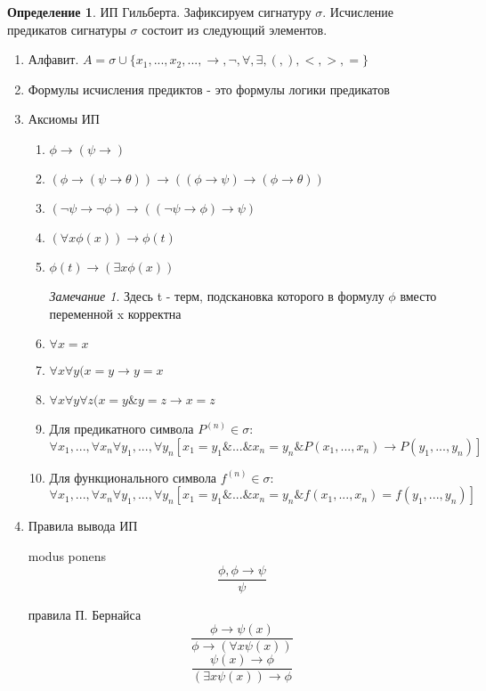 \documentclass[a4paper]{article}
\theoremstyle{definition}
\newtheorem*{definition}{Определение}
\theoremstyle{remark}
\newtheorem*{remark}{Замечание}
\begin{document}
	\begin{definition}
		ИП Гильберта. 
		Зафиксируем сигнатуру $\sigma$. Исчисление предикатов сигнатуры $\sigma$ состоит из следующий элементов.
		\begin{enumerate}
			\item Алфавит. $A = \sigma \cup \{x_1, ..., x_2, ..., \rightarrow, \neg, \forall, \exists, (, ), <,> , =\}$
			\item Формулы исчисления предиктов - это формулы логики предикатов
			\item Аксиомы ИП
			\begin{enumerate}
				\item $\phi \rightarrow (\psi \rightarrow)$
				\item $(\phi \rightarrow (\psi \rightarrow \theta)) \rightarrow ((\phi \rightarrow \psi) \rightarrow (\phi \rightarrow \theta))$
				\item $(\neg \psi \rightarrow \neg \phi) \rightarrow ((\neg \psi \rightarrow \phi) \rightarrow \psi)$
				\item $(\forall x \phi(x)) \rightarrow \phi(t)$
				\item $\phi(t) \rightarrow (\exists x \phi(x))$
				\begin{remark}
					Здесь t - терм, подскановка которого в формулу $\phi$ вместо переменной x корректна
				\end{remark}
				\item $\forall x = x$
				\item $\forall x\forall y (x = y \rightarrow y = x$
				\item $\forall x \forall y \forall z (x = y \& y = z \rightarrow x = z$
				\item Для предикатного символа $P^{(n)} \in \sigma$: $$\forall x_1, ..., \forall x_n \forall y_1, ..., \forall y_n [x_1 = y_1 \& ... \& x_n = y_n \& P(x_1, ..., x_n) \rightarrow P(y_1, ..., y_n)]$$
				\item Для функционального символа $f^{(n)} \in \sigma$: $$\forall x_1, ..., \forall x_n \forall y_1, ..., \forall y_n [x_1 = y_1 \& ... \& x_n = y_n \& f(x_1, ..., x_n) = f(y_1, ..., y_n)]$$
			\end{enumerate}
			\item Правила вывода ИП

				modus ponens $$\frac{\phi, \phi \rightarrow \psi}{\psi}$$

				правила П. Бернайса $$\frac{\phi \rightarrow \psi(x)}{\phi \rightarrow (\forall x \psi(x))}$$ $$\frac{\psi(x) \rightarrow \phi}{(\exists x \psi(x)) \rightarrow \phi}$$
		\end{enumerate}
	\end{definition}
\end{document}
